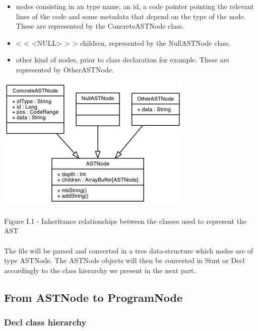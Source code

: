 \documentclass{report}
\begin{document}
\vspace{4mm}
\begin{itemize}
\item nodes consisting in an type name, an id, a code pointer pointing the relevant lines of the code and some
metadata that depend on the type of the node. These are represented by the ConcreteASTNode class.\vspace{1mm}
\item < < <NULL> > > children, represented by the NullASTNode class.\vspace{1mm}
\item other kind of nodes, prior to class declaration for example. These are represented by OtherASTNode.\vspace{1mm}
\end{itemize}

\begin{center}
\includegraphics[scale=0.8]{data/ASTNode.png}
~\\~\\Figure I.1 - Inheritance relationships between the classes used to represent the AST
\end{center}

\paragraph{}
\hspace{4mm}\textnormal{The file will be parsed and converted in a tree data-structure which nodes are of type ASTNode. The ASTNode objects
will then be converted in Stmt or Decl accordingly to the class hierarchy we present in the next part.}

\subsection{From ASTNode to ProgramNode}

\subsubsection{Decl class hierarchy}
\end{document}
